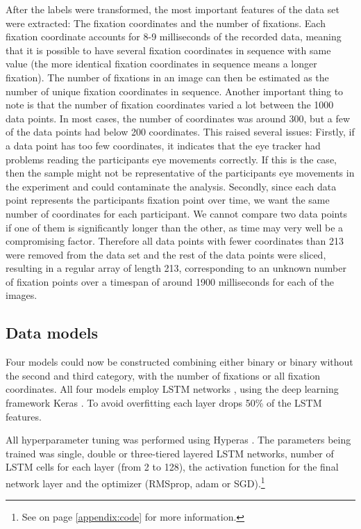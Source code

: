 \documentclass{llncs}
\begin{document}
After the labels were transformed, the most important features of the data set were extracted: The fixation coordinates and the number of fixations. Each fixation coordinate accounts for 8-9 milliseconds of the recorded data, meaning that it is possible to have several fixation coordinates in sequence with same value (the more identical fixation coordinates in sequence means a longer fixation). The number of fixations in an image can then be estimated as the number of unique fixation coordinates in sequence. Another important thing to note is that the number of fixation coordinates varied a lot between the 1000 data points. In most cases, the number of coordinates was around 300, but a few of the data points had below 200 coordinates. This raised several issues: Firstly, if a data point has too few coordinates, it indicates that the eye tracker had problems reading the participants eye movements correctly. If this is the case, then the sample might not be representative of the participants eye movements in the experiment and could contaminate the analysis. Secondly, since each data point represents the participants fixation point over time, we want the same number of coordinates for each participant. We cannot compare two data points if one of them is significantly longer than the other, as time may very well be a compromising factor. Therefore all data points with fewer coordinates than 213 were removed from the data set and the rest of the data points were sliced, resulting in a regular array of length 213, corresponding to an unknown number of fixation points over a timespan of around 1900 milliseconds for each of the images. 

\subsection{Data models}
Four models could now be constructed combining either binary or binary without the second and third category, with the number of fixations or all fixation coordinates.
All four models employ LSTM networks \cite{schmidhuber2015}, using the deep learning framework Keras \cite{keras}. To avoid overfitting each layer drops 50\% of the LSTM features. 

All hyperparameter tuning was performed using Hyperas \cite{hyperas}. The parameters being trained was single, double or three-tiered layered LSTM networks, number of LSTM cells for each layer (from 2 to 128), the activation function for the final network layer and the optimizer (RMSprop, adam or SGD).\footnote{See  on page \ref{appendix:code} for more information.}
\end{document}
